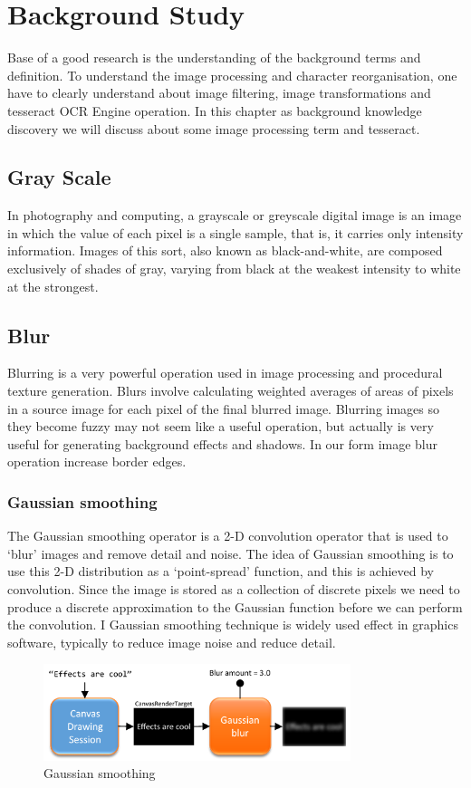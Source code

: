 \chapter {Background Study}
\label{background_study}
Base of a good research is the understanding of the background terms and definition. To understand the image processing and character reorganisation, one have to clearly understand about image filtering, image transformations and tesseract OCR Engine operation. In this chapter as background knowledge discovery we will discuss about some image processing term and tesseract.

\section{Gray Scale}
In photography and computing, a grayscale or greyscale digital image is an image in which the value of each pixel is a single sample, that is, it carries only intensity information. Images of this sort, also known as black-and-white, are composed exclusively of shades of gray, varying from black at the weakest intensity to white at the strongest. \cite{GrayScale}

\section{Blur}
Blurring is a very powerful operation used in image processing and procedural texture generation. Blurs involve calculating weighted averages of areas of pixels in a source image for each pixel of the final blurred image. Blurring images so they become fuzzy may not seem like a useful operation, but actually is very useful for generating background effects and shadows\cite{GaussianSmoothing}. In our form image blur operation increase border edges.

\subsection{Gaussian smoothing}
The Gaussian smoothing operator is a 2-D convolution operator that is used to `blur' images and remove detail and noise. The idea of Gaussian smoothing is to use this 2-D distribution as a `point-spread' function, and this is achieved by convolution. Since the image is stored as a collection of discrete pixels we need to produce a discrete approximation to the Gaussian function before we can perform the convolution. I Gaussian smoothing technique is widely used effect in graphics software, typically to reduce image noise and reduce detail. \cite{GaussianSmoothing}
\begin{figure}[H]
\centering
\label{fig:Blur} 
\includegraphics[width=0.8\textwidth]{Blur.png}
\caption {Gaussian smoothing}
\end{figure}

